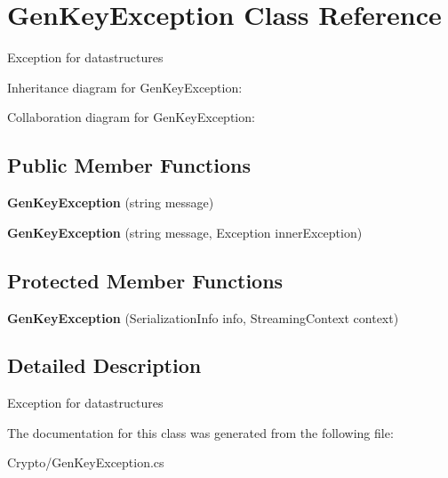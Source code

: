 \hypertarget{class_gen_key_exception}{\section{Gen\+Key\+Exception Class Reference}
\label{class_gen_key_exception}
}


Exception for datastructures  




Inheritance diagram for Gen\+Key\+Exception\+:


Collaboration diagram for Gen\+Key\+Exception\+:
\subsection*{Public Member Functions}
\begin{DoxyCompactItemize}
\item 
\hypertarget{class_gen_key_exception_ae8de93a8f016d67c2c8cfde1fe3d15c4}{{\bfseries Gen\+Key\+Exception} (string message)}\label{class_gen_key_exception_ae8de93a8f016d67c2c8cfde1fe3d15c4}

\item 
\hypertarget{class_gen_key_exception_a89df8b04638fae6a155849d109d2189b}{{\bfseries Gen\+Key\+Exception} (string message, Exception inner\+Exception)}\label{class_gen_key_exception_a89df8b04638fae6a155849d109d2189b}

\end{DoxyCompactItemize}
\subsection*{Protected Member Functions}
\begin{DoxyCompactItemize}
\item 
\hypertarget{class_gen_key_exception_a728c2a0086dd84b7b23487b2af04e0fa}{{\bfseries Gen\+Key\+Exception} (Serialization\+Info info, Streaming\+Context context)}\label{class_gen_key_exception_a728c2a0086dd84b7b23487b2af04e0fa}

\end{DoxyCompactItemize}


\subsection{Detailed Description}
Exception for datastructures 



The documentation for this class was generated from the following file\+:\begin{DoxyCompactItemize}
\item 
Crypto/Gen\+Key\+Exception.\+cs\end{DoxyCompactItemize}
